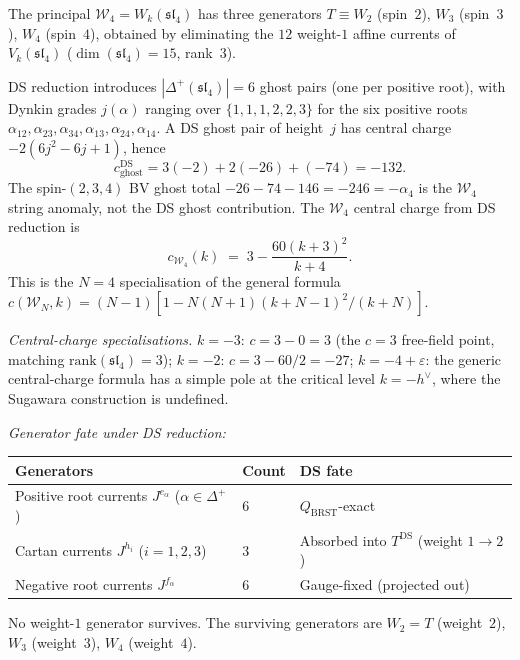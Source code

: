 \begin{computation}
\label{comp:w4-ds-data}
%
The principal $\mathcal{W}_4 = W_k(\mathfrak{sl}_4)$ has three
generators $T \equiv W_2$ (spin~$2$), $W_3$ (spin~$3$),
$W_4$ (spin~$4$), obtained by eliminating the $12$ weight-$1$
affine currents of $V_k(\mathfrak{sl}_4)$
($\dim(\mathfrak{sl}_4) = 15$, rank~$3$).

DS reduction introduces $|\Delta^+(\mathfrak{sl}_4)| = 6$ ghost
pairs (one per positive root), with Dynkin grades $j(\alpha)$
ranging over $\{1, 1, 1, 2, 2, 3\}$ for the six positive roots
$\alpha_{12}, \alpha_{23}, \alpha_{34}, \alpha_{13}, \alpha_{24},
\alpha_{14}$. A DS ghost pair of height~$j$ has central charge
$-2(6j^2-6j+1)$, hence
\[
c_{\mathrm{ghost}}^{\mathrm{DS}}
=3(-2)+2(-26)+(-74)=-132.
\]
The spin-$(2,3,4)$ BV ghost total
$-26-74-146=-246=-\alpha_4$ is the $\mathcal W_4$ string
anomaly, not the DS ghost contribution.
The $\mathcal{W}_4$ central charge from DS reduction is
\begin{equation}
\label{eq:w4-central-charge}
c_{\mathcal{W}_4}(k)
\;=\; 3 - \frac{60(k+3)^2}{k+4}.
\end{equation}
This is the $N = 4$ specialisation of the general formula
$c(\mathcal{W}_N, k) = (N-1)[1 - N(N+1)(k+N-1)^2/(k+N)]$.

\emph{Central-charge specialisations.}
$k = -3$: $c = 3 - 0 = 3$ (the $c = 3$ free-field point,
matching $\mathrm{rank}(\mathfrak{sl}_4) = 3$);
$k = -2$: $c = 3 - 60/2 = -27$;
$k = -4 + \varepsilon$: the generic central-charge formula has a
simple pole at the critical level $k = -h^\vee$, where the Sugawara
construction is undefined.

\emph{Generator fate under DS reduction:}
\begin{center}
\small
\renewcommand{\arraystretch}{1.3}
\begin{tabular}{lll}
\toprule
\textbf{Generators} & \textbf{Count} & \textbf{DS fate} \\
\midrule
Positive root currents
 $J^{e_\alpha}$ ($\alpha \in \Delta^+$) & $6$ &
 $Q_{\mathrm{BRST}}$-exact \\
Cartan currents $J^{h_i}$ ($i = 1,2,3$) & $3$ &
 Absorbed into $T^{\mathrm{DS}}$ (weight $1 \to 2$) \\
Negative root currents $J^{f_\alpha}$ & $6$ &
 Gauge-fixed (projected out) \\
\bottomrule
\end{tabular}
\end{center}
No weight-$1$ generator survives. The surviving generators are
$W_2 = T$ (weight~$2$), $W_3$ (weight~$3$), $W_4$ (weight~$4$).
\end{computation}

